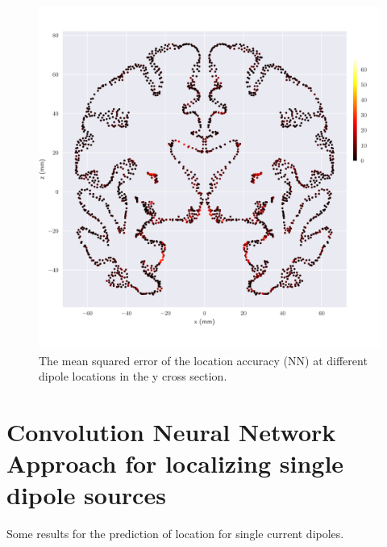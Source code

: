 \documentclass[a4paper, UKenglish, 11pt]{uiomaster}
\begin{document}
\begin{figure}[!htb]
    \centering
    \includegraphics[width=\linewidth]{../Code/plots/mse_y_plane.pdf}
    \caption{The mean squared error of the location accuracy (NN) at different dipole locations
    in the y cross section.}
    \label{fig:single_dipole_accuracy}
\end{figure}



\section{Convolution Neural Network Approach for localizing single dipole sources}

Some results for the prediction of location for single current dipoles.
\end{document}
